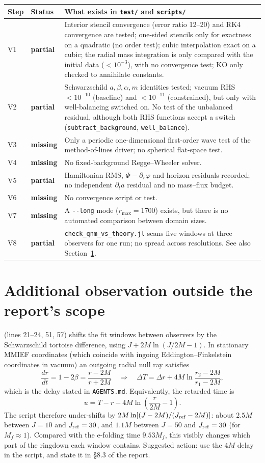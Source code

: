 \documentclass[11pt,a4paper]{article}
\newcommand{\Part}{\textcolor{partcol}{\sffamily\bfseries partial}}
\newcommand{\Miss}{\textcolor{misscol}{\sffamily\bfseries missing}}
\newcommand{\dt}{\partial_t}
\newcommand{\dr}{\partial_r}
\begin{document}
\small
\begin{longtable}{@{}L{1.0cm}L{1.6cm}L{13.1cm}@{}}
\toprule
\textbf{Step} & \textbf{Status} & \textbf{What exists in \texttt{test/} and \texttt{scripts/}}\\
\midrule
\endhead
V1 & \Part & Interior stencil convergence (error ratio 12--20) and RK4 convergence are tested; one-sided stencils only for exactness on a quadratic (no order test); cubic interpolation exact on a cubic; the radial mass integration is only compared with the initial data ($<10^{-3}$), with no convergence test; KO only checked to annihilate constants.\\
V2 & \Part & Schwarzschild $a,\beta,\alpha,m$ identities tested; vacuum RHS $<10^{-10}$ (baseline) and $<10^{-11}$ (constrained), but only with well-balancing switched on. No test of the unbalanced residual, although both RHS functions accept a switch (\texttt{subtract\_background}, \texttt{well\_balance}).\\
V3 & \Miss & Only a periodic one-dimensional first-order wave test of the method-of-lines driver; no spherical flat-space test.\\
V4 & \Miss & No fixed-background Regge--Wheeler solver.\\
V5 & \Part & Hamiltonian RMS, $\Phi-\dr\varphi$ and horizon residuals recorded; no independent $\dt a$ residual and no mass--flux budget.\\
V6 & \Miss & No convergence script or test.\\
V7 & \Miss & A \texttt{-{}-long} mode ($r_{\max}=1700$) exists, but there is no automated comparison between domain sizes.\\
V8 & \Part & \texttt{check\_qnm\_vs\_theory.jl} scans five windows at three observers for one run; no spread across resolutions. See also Section~\ref{sec:extra}.\\
\bottomrule
\end{longtable}
\normalsize

\section{Additional observation outside the report's scope}\label{sec:extra}

 (lines 21--24, 51, 57) shifts the fit windows between
observers by the Schwarzschild tortoise difference, using $J+2M\ln(J/2M-1)$. In stationary
MMIEF coordinates (which coincide with ingoing Eddington--Finkelstein coordinates in vacuum) an
outgoing radial null ray satisfies
\[
  \frac{dr}{dt}=1-2\beta=\frac{r-2M}{r+2M}
  \quad\Longrightarrow\quad
  \Delta T=\Delta r+4M\ln\frac{r_2-2M}{r_1-2M},
\]
which is the delay stated in \texttt{AGENTS.md}. Equivalently, the retarded time is
\[
  u=T-r-4M\ln\left(\frac{r}{2M}-1\right).
\]
The script therefore under-shifts by $2M\ln[(J-2M)/(J_{\rm ref}-2M)]$:
about $2.5M$ between $J=10$ and $J_{\rm ref}=30$, and $1.1M$ between $J=50$ and $J_{\rm ref}=30$
(for $M_f\approx1$). Compared with the e-folding time $9.53M_f$, this visibly changes which part
of the ringdown each window contains. Suggested action: use the $4M$ delay in the script, and
state it in \S8.3 of the report.
\end{document}
